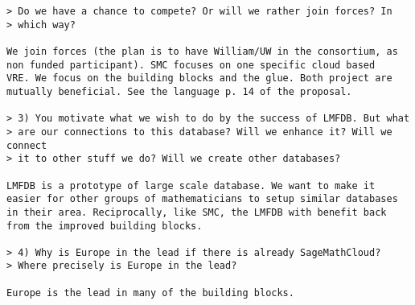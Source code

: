 \begin{draft}
\begin{verbatim}
> Do we have a chance to compete? Or will we rather join forces? In
> which way?

We join forces (the plan is to have William/UW in the consortium, as
non funded participant). SMC focuses on one specific cloud based
VRE. We focus on the building blocks and the glue. Both project are
mutually beneficial. See the language p. 14 of the proposal.

> 3) You motivate what we wish to do by the success of LMFDB. But what
> are our connections to this database? Will we enhance it? Will we connect
> it to other stuff we do? Will we create other databases?

LMFDB is a prototype of large scale database. We want to make it
easier for other groups of mathematicians to setup similar databases
in their area. Reciprocally, like SMC, the LMFDB with benefit back
from the improved building blocks.

> 4) Why is Europe in the lead if there is already SageMathCloud?
> Where precisely is Europe in the lead?

Europe is the lead in many of the building blocks.
\end{verbatim}







\renewcommand{\thepage}{\arabic{page}}
\setcounter{page}{1}
\black
\cleardoublepage
\end{draft}

